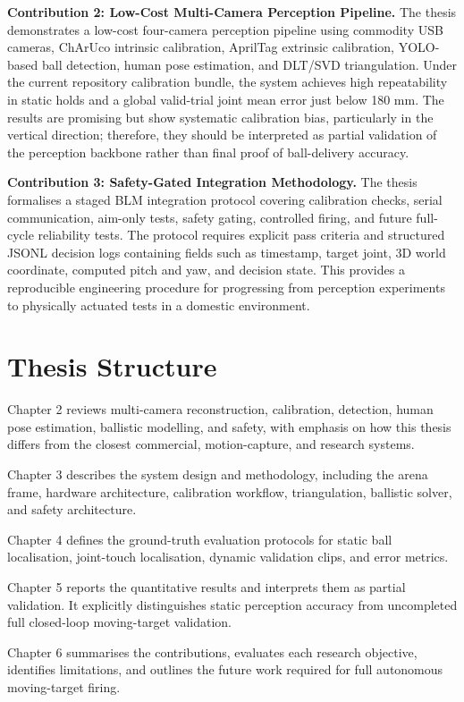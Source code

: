 \textbf{Contribution 2: Low-Cost Multi-Camera Perception Pipeline.}
The thesis demonstrates a low-cost four-camera perception pipeline using commodity USB cameras, ChArUco intrinsic calibration, AprilTag extrinsic calibration, YOLO-based ball detection, human pose estimation, and DLT/SVD triangulation. Under the current repository calibration bundle, the system achieves high repeatability in static holds and a global valid-trial joint mean error just below 180 mm. The results are promising but show systematic calibration bias, particularly in the vertical direction; therefore, they should be interpreted as partial validation of the perception backbone rather than final proof of ball-delivery accuracy.

\textbf{Contribution 3: Safety-Gated Integration Methodology.}
The thesis formalises a staged BLM integration protocol covering calibration checks, serial communication, aim-only tests, safety gating, controlled firing, and future full-cycle reliability tests. The protocol requires explicit pass criteria and structured JSONL decision logs containing fields such as timestamp, target joint, 3D world coordinate, computed pitch and yaw, and decision state. This provides a reproducible engineering procedure for progressing from perception experiments to physically actuated tests in a domestic environment.

\section{Thesis Structure}

Chapter 2 reviews multi-camera reconstruction, calibration, detection, human pose estimation, ballistic modelling, and safety, with emphasis on how this thesis differs from the closest commercial, motion-capture, and research systems.

Chapter 3 describes the system design and methodology, including the arena frame, hardware architecture, calibration workflow, triangulation, ballistic solver, and safety architecture.

Chapter 4 defines the ground-truth evaluation protocols for static ball localisation, joint-touch localisation, dynamic validation clips, and error metrics.

Chapter 5 reports the quantitative results and interprets them as partial validation. It explicitly distinguishes static perception accuracy from uncompleted full closed-loop moving-target validation.

Chapter 6 summarises the contributions, evaluates each research objective, identifies limitations, and outlines the future work required for full autonomous moving-target firing.
